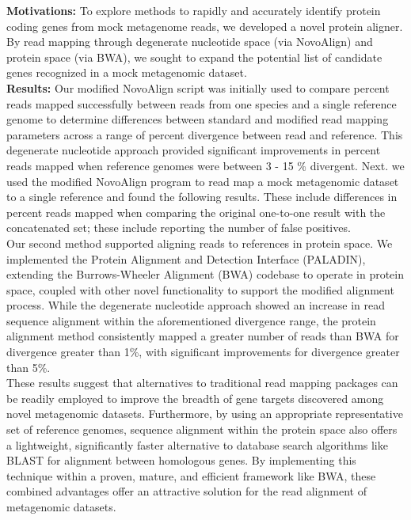 \textbf{Motivations:} To explore methods to rapidly and accurately identify protein coding genes from mock metagenome reads, we developed a novel protein aligner. By read mapping through degenerate nucleotide space (via NovoAlign) and protein space (via BWA), we sought to expand the potential list of candidate genes recognized in a mock metagenomic dataset.\\
\textbf{Results:} Our modified NovoAlign script was initially used to compare percent reads mapped successfully between reads from one species and a single reference genome to determine differences between standard and modified read mapping parameters across a range of percent divergence between read and reference. This degenerate nucleotide approach provided significant improvements in percent reads mapped when reference genomes were between 3 - 15 \% divergent. Next. we used the modified NovoAlign program to read map a mock metagenomic dataset to a single reference and found the following results. These include differences in percent reads mapped when comparing the original one-to-one result with the concatenated set; these include reporting the number of false positives. \\

Our second method supported aligning reads to references in protein space.  We implemented the Protein Alignment and Detection Interface (PALADIN), extending the Burrows-Wheeler Alignment (BWA) codebase to operate in protein space, coupled with other novel functionality to support the modified alignment process.  While  the degenerate nucleotide approach showed an increase in read sequence alignment within the aforementioned divergence range, the protein alignment method consistently mapped a greater number of reads than BWA for divergence greater than 1\%, with significant improvements for divergence greater than 5\%.  \\

These results suggest that alternatives to traditional read mapping packages can be readily employed to improve the breadth of gene targets discovered among novel metagenomic datasets. Furthermore, by using an appropriate representative set of reference genomes, sequence alignment within the protein space also offers a lightweight, significantly faster alternative to database search algorithms like BLAST for alignment between homologous genes.  By implementing this technique within a proven, mature, and efficient framework like BWA, these combined advantages offer an attractive solution for the read alignment of metagenomic datasets.
